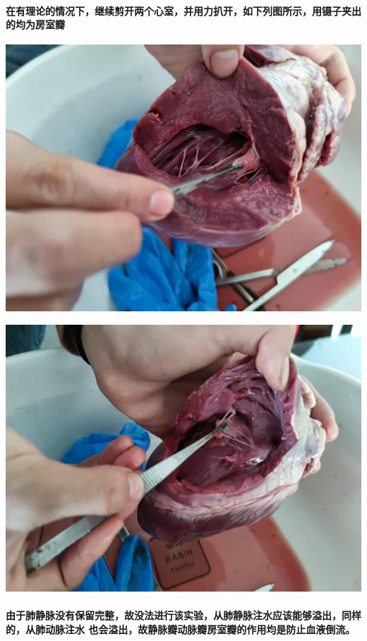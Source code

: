 \documentclass[final,11pt,oneside,UTF8]{report}
\begin{document}
\paragraph{
    在有理论的情况下，继续剪开两个心室，并用力扒开，如下列图所示，用镊子夹出的均为房室瓣
}
\begin{center}
    \includegraphics[scale=0.1,angle=0]{photos/Rm.jpg}
\end{center}
\begin{center}
    \includegraphics[scale=0.1,angle=0]{photos/Lm.jpg}
\end{center}
\paragraph{
    由于肺静脉没有保留完整，故没法进行该实验，从肺静脉注水应该能够溢出，同样的，从肺动脉注水
    也会溢出，故静脉瓣动脉瓣房室瓣的作用均是防止血液倒流。
}
\end{document}
